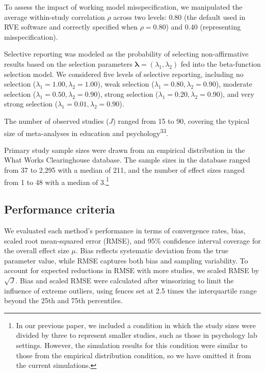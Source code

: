 \documentclass[
  american,
  man, donotrepeattitle,floatsintext]{apa7}
\begin{document}
To assess the impact of working model misspecification, we manipulated the average within-study correlation \(\rho\) across two levels: 0.80 (the default used in RVE software and correctly specified when \(\rho = 0.80\)) and 0.40 (representing misspecification).

Selective reporting was modeled as the probability of selecting non-affirmative results based on the selection parameters \(\boldsymbol\lambda = (\lambda_1, \lambda_2)\) fed into the beta-function selection model. We considered five levels of selective reporting, including no selection (\(\lambda_1 = 1.00, \lambda_2 = 1.00\)), weak selection (\(\lambda_1 = 0.80, \lambda_2 = 0.90\)), moderate selection (\(\lambda_1 = 0.50, \lambda_2 = 0.90\)), strong selection (\(\lambda_1 = 0.20, \lambda_2 = 0.90\)), and very strong selection (\(\lambda_1 = 0.01, \lambda_2 = 0.90\)).

The number of observed studies (\(J\)) ranged from 15 to 90, covering the typical size of meta-analyses in education and psychology\textsuperscript{33}.

Primary study sample sizes were drawn from an empirical distribution in the What Works Clearinghouse database. The sample sizes in the database ranged from 37 to 2,295 with a median of 211, and the number of effect sizes ranged from 1 to 48 with a median of 3.\footnote{
  In our previous paper, we included a condition in which the study sizes were divided by three to represent smaller studies, such as those in psychology lab settings. However, the simulation results for this condition were similar to those from the empirical distribution condition, so we have omitted it from the current simulations.}

\subsection{Performance criteria}\label{performance-criteria}

We evaluated each method's performance in terms of convergence rates, bias, scaled root mean-squared error (RMSE), and 95\% confidence interval coverage for the overall effect size \(\mu\). Bias reflects systematic deviation from the true parameter value, while RMSE captures both bias and sampling variability. To account for expected reductions in RMSE with more studies, we scaled RMSE by \(\sqrt{J}\). Bias and scaled RMSE were calculated after winsorizing to limit the influence of extreme outliers, using fences set at 2.5 times the interquartile range beyond the 25th and 75th percentiles.
\end{document}
